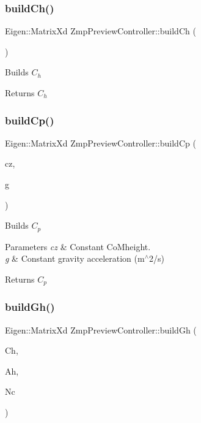 \subsubsection{\texorpdfstring{build\+Ch()}{buildCh()}}
{\footnotesize\ttfamily Eigen\+::\+Matrix\+Xd Zmp\+Preview\+Controller\+::build\+Ch (\begin{DoxyParamCaption}{ }\end{DoxyParamCaption})}

Builds $C_h$

\begin{DoxyReturn}{Returns}
$C_h$ 
\end{DoxyReturn}
\hypertarget{classZmpPreviewController_a716fdc040e5eaf9f6fe00c652f205d73}{}\label{classZmpPreviewController_a716fdc040e5eaf9f6fe00c652f205d73} 
\subsubsection{\texorpdfstring{build\+Cp()}{buildCp()}}
{\footnotesize\ttfamily Eigen\+::\+Matrix\+Xd Zmp\+Preview\+Controller\+::build\+Cp (\begin{DoxyParamCaption}\item[{const double}]{cz,  }\item[{const double}]{g }\end{DoxyParamCaption})}

Builds $C_p$


\begin{DoxyParams}{Parameters}
{\em cz} & Constant Co\+Mheight. \\
\hline
{\em g} & Constant gravity acceleration (m$^\wedge$2/s)\\
\hline
\end{DoxyParams}
\begin{DoxyReturn}{Returns}
$C_p$ 
\end{DoxyReturn}
\hypertarget{classZmpPreviewController_ac0e73fabb20f31dbbb85ce61414dbb87}{}\label{classZmpPreviewController_ac0e73fabb20f31dbbb85ce61414dbb87} 
\subsubsection{\texorpdfstring{build\+Gh()}{buildGh()}}
{\footnotesize\ttfamily Eigen\+::\+Matrix\+Xd Zmp\+Preview\+Controller\+::build\+Gh (\begin{DoxyParamCaption}\item[{Eigen\+::\+Matrix\+Xd}]{Ch,  }\item[{Eigen\+::\+Matrix\+Xd}]{Ah,  }\item[{const int}]{Nc }\end{DoxyParamCaption})}

